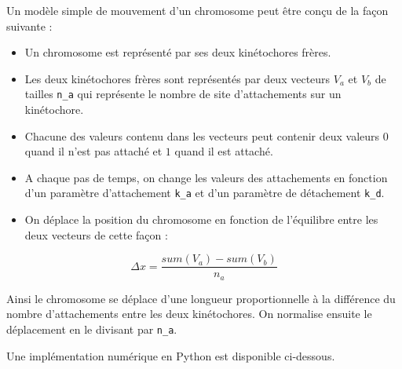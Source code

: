 \documentclass[12pt,a4paper,twoside,openright]{book}
\begin{document}
Un modèle simple de mouvement d'un chromosome peut être conçu de la
façon suivante :

\begin{itemize}
\item
  Un chromosome est représenté par ses deux kinétochores frères.
\item
  Les deux kinétochores frères sont représentés par deux vecteurs
  \(V_a\) et \(V_b\) de tailles \texttt{n\_a} qui représente le nombre
  de site d'attachements sur un kinétochore.
\item
  Chacune des valeurs contenu dans les vecteurs peut contenir deux
  valeurs \(0\) quand il n'est pas attaché et \(1\) quand il est
  attaché.
\item
  A chaque pas de temps, on change les valeurs des attachements en
  fonction d'un paramètre d'attachement \texttt{k\_a} et d'un paramètre
  de détachement \texttt{k\_d}.
\item
  On déplace la position du chromosome en fonction de l'équilibre entre
  les deux vecteurs de cette façon :
\end{itemize}

\[
\Delta x = \frac{sum(V_a) - sum(V_b)}{n_a}
\]

Ainsi le chromosome se déplace d'une longueur proportionnelle à la
différence du nombre d'attachements entre les deux kinétochores. On
normalise ensuite le déplacement en le divisant par \texttt{n\_a}.

Une implémentation numérique en Python est disponible ci-dessous.
\end{document}
